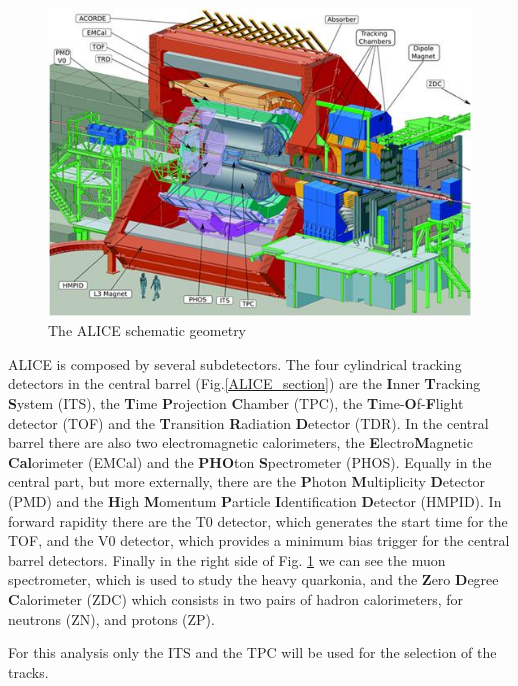 \documentclass[a4paper,twocolumn,gsifonts,twoside]{gsipaper}
\begin{document}
\begin{figure}[tb]
\begin{center}
\includegraphics[scale = 1.1]{ALICE_detector.jpg}
\caption{The ALICE schematic geometry}
\label{ALICE}
\end{center}
\end{figure}

ALICE is composed by several subdetectors. The four cylindrical tracking detectors in the central barrel (Fig.\ref{ALICE_section}) are 
the \textbf{I}nner \textbf{T}racking \textbf{S}ystem (ITS), the \textbf{T}ime \textbf{P}rojection \textbf{C}hamber (TPC), the 
\textbf{T}ime-\textbf{O}f-\textbf{F}light detector (TOF) and the \textbf{T}ransition \textbf{R}adiation \textbf{D}etector (TDR). 
In the central barrel there are also two electromagnetic calorimeters, the \textbf{E}lectro\textbf{M}agnetic \textbf{Cal}orimeter (EMCal)
and the \textbf{PHO}ton \textbf{S}pectrometer (PHOS). Equally in the central part, but more externally, there are the \textbf{P}hoton 
\textbf{M}ultiplicity \textbf{D}etector (PMD) and the \textbf{H}igh \textbf{M}omentum \textbf{P}article \textbf{I}dentification 
\textbf{D}etector (HMPID). In forward rapidity there are the T0 detector, which generates the start time for the TOF, and the V0 
detector, which provides a minimum bias trigger for the central barrel detectors.
Finally in the right side of Fig. \ref{ALICE} we can see the muon spectrometer, which is used to study the heavy quarkonia,
and the \textbf{Z}ero \textbf{D}egree \textbf{C}alorimeter (ZDC) which consists in two pairs of hadron calorimeters, for neutrons (ZN), 
and protons (ZP).

For this analysis only the ITS and the TPC will be used for the selection of the tracks.
\end{document}
